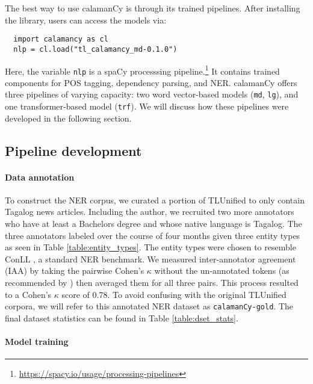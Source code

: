 \documentclass[11pt]{article}
\begin{document}
The best way to use calamanCy is through its trained pipelines.
After installing the library, users can access the models via:

\begin{verbatim}
  import calamancy as cl
  nlp = cl.load("tl_calamancy_md-0.1.0")
\end{verbatim}

Here, the variable \texttt{nlp} is a spaCy processsing pipeline.\footnote[2]{\url{https://spacy.io/usage/processing-pipelines}}
It contains trained components for POS tagging, dependency parsing, and NER.
calamanCy offers three pipelines of varying capacity: two word vector-based models (\texttt{md}, \texttt{lg}), and one transformer-based model (\texttt{trf}).
We will discuss how these pipelines were developed in the following section.

\subsection{Pipeline development}

\paragraph*{Data annotation}
To construct the NER corpus, we curated a portion of TLUnified \citep{Cruz2021ImprovingLL} to only contain Tagalog news articles.
Including the author, we recruited two more annotators who have at least a Bachelors degree and whose native language is Tagalog.
The three annotators labeled over the course of four months given three entity types as seen in Table \ref{table:entity_types}.
The entity types were chosen to resemble ConLL \citep{Sang2002IntroductionTT,Sang2003IntroductionTT}, a standard NER benchmark.
We measured inter-annotator agreement (IAA) by taking the pairwise Cohen's $\kappa$ without the un-annotated tokens (as recommended by \citealp{Delger2012BuildingGS}) then averaged them for all three pairs.
This process resulted to a Cohen's $\kappa$ score of 0.78. 
To avoid confusing with the original TLUnified corpora, we will refer to this annotated NER dataset as \texttt{calamanCy-gold}.
The final dataset statistics can be found in Table \ref{table:dset_stats}.



\paragraph*{Model training}
\end{document}
